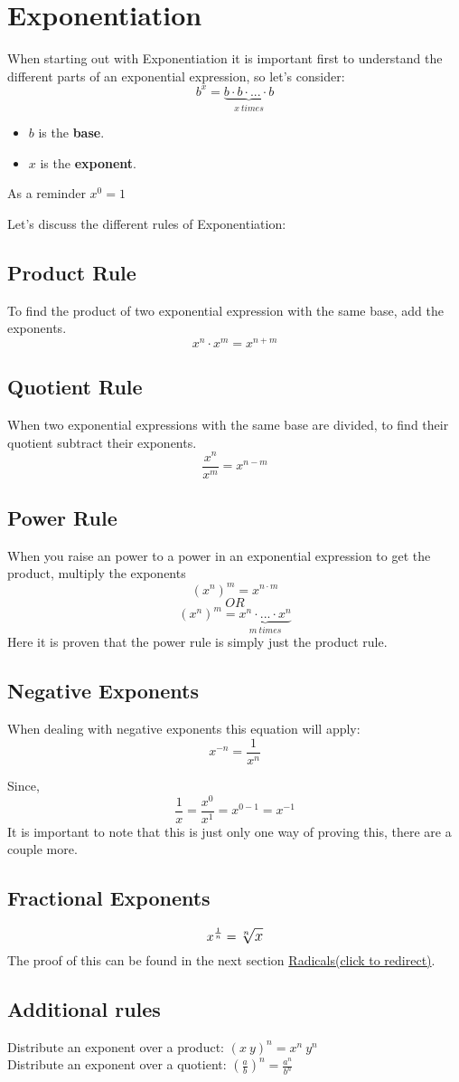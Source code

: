 \section{Exponentiation}
When starting out with Exponentiation it is important first to understand the different parts of an exponential expression, so let's consider:
$$b^x = \underbrace{b \cdot b \cdot ... \cdot b}_{x \ times}$$
\begin{itemize}
  \item $b$ is the \textbf{base}.
  \item $x$ is the \textbf{exponent}.
\end{itemize}

As a reminder $ x^0 = 1 $

Let's discuss the different rules of Exponentiation:
\subsection{Product Rule}
To find the product of two exponential expression with the same base, add the exponents. 
$$ x^{n} \cdot x^{m} = x^{n+m} $$

\subsection{Quotient Rule}
When two exponential expressions with the same base are divided,  to find their quotient subtract their exponents. 
$$ \frac{x^n}{x^m} = x^{n-m} $$

\subsection{Power Rule}
When you raise an power to a power in an exponential expression to get the product, multiply the exponents
$$ (x^{n})^{m} = x^{n \cdot m} $$ 
$$ OR $$
$$ (x^{n})^{m} = \underbrace{x^n \cdot ... \cdot x^n}_{m \ times} $$
Here it is proven that the power rule is simply just the product rule.

\subsection{Negative Exponents}
When dealing with negative exponents this equation will apply: 
$$ x^{-n} = \frac{1}{x^n} $$

Since, 
$$ \frac{1}{x} = \frac{x^0}{x^1} = x^{0-1} = x^{-1} $$
It is important to note that this is just only one way of proving this, there are a couple more. 

\subsection{Fractional Exponents}
$$ \large x^{\frac{1}{n}} = \sqrt[n]{x} $$
The proof of this can be found in the next section \hyperref[sec:radicals]{Radicals(click to redirect)}.

\subsection{Additional rules}
Distribute an exponent over a product: $(x \ y)^{n} = x^{n} \ y^{n}$ \\
Distribute an exponent over a quotient: $  (\frac{a}{b})^{n} = \frac{a^{n}}{b^{n}}$

\newpage